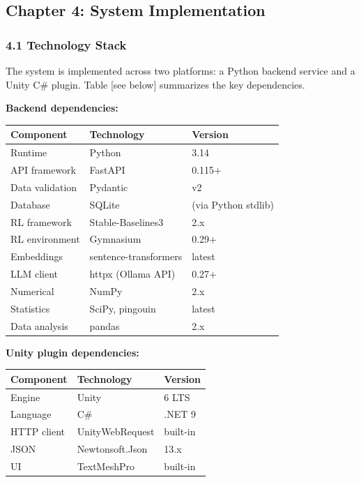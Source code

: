 \subsection{Chapter 4: System
Implementation}\label{chapter-4-system-implementation}

\subsubsection{4.1 Technology Stack}\label{technology-stack}

The system is implemented across two platforms: a Python backend service
and a Unity C\# plugin. Table {[}see below{]} summarizes the key
dependencies.

\textbf{Backend dependencies:}

\begin{longtable}[]{@{}lll@{}}
\toprule\noalign{}
Component & Technology & Version \\
\midrule\noalign{}
\endhead
\bottomrule\noalign{}
\endlastfoot
Runtime & Python & 3.14 \\
API framework & FastAPI & 0.115+ \\
Data validation & Pydantic & v2 \\
Database & SQLite & (via Python stdlib) \\
RL framework & Stable-Baselines3 & 2.x \\
RL environment & Gymnasium & 0.29+ \\
Embeddings & sentence-transformers & latest \\
LLM client & httpx (Ollama API) & 0.27+ \\
Numerical & NumPy & 2.x \\
Statistics & SciPy, pingouin & latest \\
Data analysis & pandas & 2.x \\
\end{longtable}

\textbf{Unity plugin dependencies:}

\begin{longtable}[]{@{}lll@{}}
\toprule\noalign{}
Component & Technology & Version \\
\midrule\noalign{}
\endhead
\bottomrule\noalign{}
\endlastfoot
Engine & Unity & 6 LTS \\
Language & C\# & .NET 9 \\
HTTP client & UnityWebRequest & built-in \\
JSON & Newtonsoft.Json & 13.x \\
UI & TextMeshPro & built-in \\
\end{longtable}

